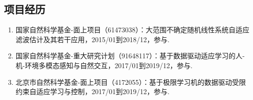 \begin{publications}{99}
\section*{项目经历}
\begin{enumerate}
\item 国家自然科学基金-面上项目（61473038）：大范围不确定随机线性系统自适应滤波估计及其若干应用，2015/01到2018/12，参与.
\item 国家自然科学基金-重大研究计划（91648117）：基于数据驱动适应学习的人-机-环境多模态感知与自然交互，2017/01到2019/12，参与.
\item 北京市自然科学基金-面上项目（4172055）：基于极限学习机的数据驱动受限约束自适应学习与控制，2017/01到2019/12，参与.
\end{enumerate}
\end{publications}
